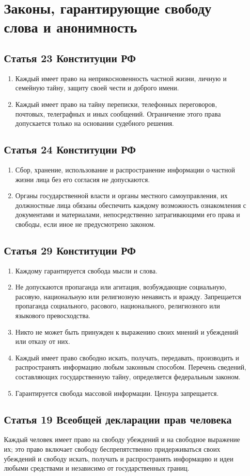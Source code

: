 \chapter{Законы, гарантирующие свободу слова и анонимность}
\section{Статья 23 Конституции РФ}
\begin{enumerate}
\item Каждый имеет право на неприкосновенность частной жизни, личную и семейную тайну, защиту своей чести и доброго имени.
\item Каждый имеет право на тайну переписки, телефонных переговоров, почтовых, телеграфных и иных сообщений. Ограничение этого права допускается только на основании судебного решения.
\end{enumerate}
\section{Статья 24 Конституции РФ}
\begin{enumerate}
\item Сбор, хранение, использование и распространение информации о частной жизни лица без его согласия не допускаются.
\item Органы государственной власти и органы местного самоуправления, их должностные лица обязаны обеспечить каждому возможность ознакомления с документами и материалами, непосредственно затрагивающими его права и свободы, если иное не предусмотрено законом.
\end{enumerate}
\section{Статья 29 Конституции РФ}
\begin{enumerate}
\item Каждому гарантируется свобода мысли и слова.
\item Не допускаются пропаганда или агитация, возбуждающие социальную, расовую, национальную или религиозную ненависть и вражду. Запрещается пропаганда социального, расового, национального, религиозного или языкового превосходства.
\item Никто не может быть принужден к выражению своих мнений и убеждений или отказу от них.
\item Каждый имеет право свободно искать, получать, передавать, производить и распространять информацию любым законным способом. Перечень сведений, составляющих государственную тайну, определяется федеральным законом.
\item Гарантируется свобода массовой информации. Цензура запрещается.
\end{enumerate}
\section{Статья 19 Всеобщей декларации прав человека}
Каждый человек имеет право на свободу убеждений и на свободное выражение их; это право включает свободу беспрепятственно придерживаться своих убеждений и свободу искать, получать и распространять информацию и идеи любыми средствами и независимо от государственных границ.
